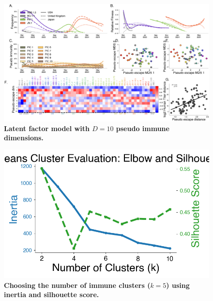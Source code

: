 \documentclass[11pt,oneside,letterpaper]{article}
\begin{document}
\begin{figure}[t!]
    \centering
    \includegraphics[width=1.0\textwidth=0.01]{./supplementary_figures/latent_immune_10_dims.png}
    \caption{
      \textbf{Latent factor model with $D=10$ pseudo immune dimensions.}
    }
    \label{fig:latent_factor_10}
\end{figure}

\begin{figure}[t!]
    \centering
    \includegraphics[width=1.0\textwidth=0.01]{./supplementary_figures/clustering_k.png}
    \caption{
        \textbf{Choosing the number of immune clusters ($k=5$) using inertia and silhouette score.}
    }
    \label{fig:choosing_k_k_means}
\end{figure}
\end{document}
